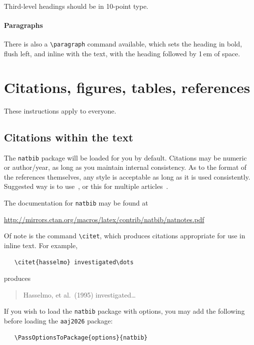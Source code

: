 \documentclass{article}
\begin{document}
Third-level headings should be in 10-point type.


\paragraph{Paragraphs}


There is also a \verb+\paragraph+ command available, which sets the heading in
bold, flush left, and inline with the text, with the heading followed by 1\,em
of space.


\section{Citations, figures, tables, references}
\label{others}


These instructions apply to everyone.


\subsection{Citations within the text}


The \verb+natbib+ package will be loaded for you by default.  Citations may be
numeric or author/year, as long as you maintain internal consistency. As to the
format of the references themselves, any style is acceptable as long as it is
used consistently. Suggested way is to use~\cite{Alexander1995}, or this for multiple articles~\cite{Bower1995,Hasselmo1995}.


The documentation for \verb+natbib+ may be found at
\begin{center}
  \url{http://mirrors.ctan.org/macros/latex/contrib/natbib/natnotes.pdf}
\end{center}
Of note is the command \verb+\citet+, which produces citations appropriate for
use in inline text.  For example,
\begin{verbatim}
   \citet{hasselmo} investigated\dots
\end{verbatim}
produces
\begin{quote}
  Hasselmo, et al.\ (1995) investigated\dots
\end{quote}


If you wish to load the \verb+natbib+ package with options, you may add the
following before loading the \verb+aaj2026+ package:
\begin{verbatim}
   \PassOptionsToPackage{options}{natbib}
\end{verbatim}
\end{document}
